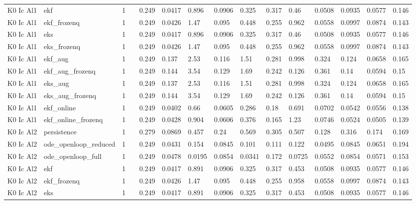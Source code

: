 \begin{table}[t]
\begin{tabular}{lllllllllllllll}
K0 Ic Al1 & ekf & 1 &  & 0.249 & 0.0417 & 0.896 & 0.0906 & 0.325 & 0.317 & 0.46 & 0.0508 & 0.0935 & 0.0577 & 0.146 \\
K0 Ic Al1 & ekf\_frozenq & 1 &  & 0.249 & 0.0426 & 1.47 & 0.095 & 0.448 & 0.255 & 0.962 & 0.0558 & 0.0997 & 0.0874 & 0.143 \\
K0 Ic Al1 & eks & 1 &  & 0.249 & 0.0417 & 0.896 & 0.0906 & 0.325 & 0.317 & 0.46 & 0.0508 & 0.0935 & 0.0577 & 0.146 \\
K0 Ic Al1 & eks\_frozenq & 1 &  & 0.249 & 0.0426 & 1.47 & 0.095 & 0.448 & 0.255 & 0.962 & 0.0558 & 0.0997 & 0.0874 & 0.143 \\
K0 Ic Al1 & ekf\_aug & 1 &  & 0.249 & 0.137 & 2.53 & 0.116 & 1.51 & 0.281 & 0.998 & 0.324 & 0.124 & 0.0658 & 0.165 \\
K0 Ic Al1 & ekf\_aug\_frozenq & 1 &  & 0.249 & 0.144 & 3.54 & 0.129 & 1.69 & 0.242 & 0.126 & 0.361 & 0.14 & 0.0594 & 0.15 \\
K0 Ic Al1 & eks\_aug & 1 &  & 0.249 & 0.137 & 2.53 & 0.116 & 1.51 & 0.281 & 0.998 & 0.324 & 0.124 & 0.0658 & 0.165 \\
K0 Ic Al1 & eks\_aug\_frozenq & 1 &  & 0.249 & 0.144 & 3.54 & 0.129 & 1.69 & 0.242 & 0.126 & 0.361 & 0.14 & 0.0594 & 0.15 \\
K0 Ic Al1 & ekf\_online & 1 &  & 0.249 & 0.0402 & 0.66 & 0.0605 & 0.286 & 0.18 & 0.691 & 0.0702 & 0.0542 & 0.0556 & 0.138 \\
K0 Ic Al1 & ekf\_online\_frozenq & 1 &  & 0.249 & 0.0428 & 0.904 & 0.0606 & 0.376 & 0.165 & 1.23 & 0.0746 & 0.0524 & 0.0505 & 0.139 \\
K0 Ic Al2 & persistence & 1 &  & 0.279 & 0.0869 & 0.457 & 0.24 & 0.569 & 0.305 & 0.507 & 0.128 & 0.316 & 0.174 & 0.169 \\
K0 Ic Al2 & ode\_openloop\_reduced & 1 &  & 0.249 & 0.0431 & 0.154 & 0.0845 & 0.101 & 0.111 & 0.122 & 0.0495 & 0.0845 & 0.0651 & 0.194 \\
K0 Ic Al2 & ode\_openloop\_full & 1 &  & 0.249 & 0.0478 & 0.0195 & 0.0854 & 0.0341 & 0.172 & 0.0725 & 0.0552 & 0.0854 & 0.0571 & 0.153 \\
K0 Ic Al2 & ekf & 1 &  & 0.249 & 0.0417 & 0.891 & 0.0906 & 0.325 & 0.317 & 0.453 & 0.0508 & 0.0935 & 0.0577 & 0.146 \\
K0 Ic Al2 & ekf\_frozenq & 1 &  & 0.249 & 0.0426 & 1.47 & 0.095 & 0.448 & 0.255 & 0.958 & 0.0558 & 0.0997 & 0.0874 & 0.143 \\
K0 Ic Al2 & eks & 1 &  & 0.249 & 0.0417 & 0.891 & 0.0906 & 0.325 & 0.317 & 0.453 & 0.0508 & 0.0935 & 0.0577 & 0.146 \\

\end{tabular}
\end{table}
